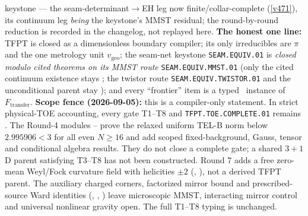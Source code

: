 \begin{keybox}
keystone --- the seam-determinant$\to$EH leg now finite/collar-complete (\vref{v471}), its continuum leg
\emph{being} the keystone's MMST residual; the round-by-round reduction is recorded in the changelog, not
replayed here.
\textbf{The honest one line:} TFPT is closed as a dimensionless boundary compiler; its only irreducibles
are $\pi$ and the one metrology unit $v_{\mathrm{geo}}$; the seam-net keystone \texttt{SEAM.EQUIV.01} is
\emph{closed modulo cited theorems on its MMST route} \texttt{SEAM.EQUIV.MMST.01} (only the cited continuum existence
stays \mO; the twistor route \texttt{SEAM.EQUIV.TWISTOR.01} and the unconditional parent stay \mO); and every ``frontier'' item is
a typed \mC\ instance of $F_{\mathrm{transfer}}$.
\textbf{Scope fence (2026-09-05):} this is a compiler-only statement.  In strict physical-TOE
accounting, every gate T1--T8 and \texttt{TFPT.TOE.COMPLETE.01} remains \mO.
The Round-4 modules
--
prove the relaxed uniform TEL-B norm below $2.995906<3$ for all even $N\ge16$
and add scoped fixed-background, Gauss, tensor and conditional algebra results.
They do not close a complete gate; a shared $3{+}1$D parent satisfying T3--T8
has not been constructed.
Round 7 adds a free zero-mean Weyl/Fock curvature field with helicities
$\pm2$ (,
), not a derived TFPT parent.
The auxiliary charged corners, factorized mirror bound and prescribed-source
Ward identities (,
, )
leave microscopic MMST, interacting mirror control and universal nonlinear
gravity open. The full T1--T8 typing is unchanged.
\end{keybox}

